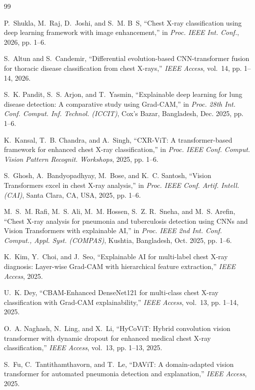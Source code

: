 \documentclass[journal]{IEEEtran}
\begin{document}
\begin{thebibliography}{99}

P.~Shukla, M.~Raj, D.~Joshi, and S.~M. B~S, ``Chest X-ray classification using deep learning framework with image enhancement,'' in \emph{Proc. IEEE Int. Conf.}, 2026, pp. 1--6.

S.~Altun and S.~Candemir, ``Differential evolution-based CNN-transformer fusion for thoracic disease classification from chest X-rays,'' \emph{IEEE Access}, vol.~14, pp. 1--14, 2026.

S.~K. Pandit, S.~S. Arjon, and T.~Yasmin, ``Explainable deep learning for lung disease detection: A comparative study using Grad-CAM,'' in \emph{Proc. 28th Int. Conf. Comput. Inf. Technol. (ICCIT)}, Cox's Bazar, Bangladesh, Dec. 2025, pp. 1--6.

K.~Kansal, T.~B. Chandra, and A.~Singh, ``CXR-ViT: A transformer-based framework for enhanced chest X-ray classification,'' in \emph{Proc. IEEE Conf. Comput. Vision Pattern Recognit. Workshops}, 2025, pp. 1--6.

S.~Ghosh, A.~Bandyopadhyay, M.~Bose, and K.~C. Santosh, ``Vision Transformers excel in chest X-ray analysis,'' in \emph{Proc. IEEE Conf. Artif. Intell. (CAI)}, Santa Clara, CA, USA, 2025, pp. 1--6.

M.~S.~M. Rafi, M.~S. Ali, M.~M. Hossen, S.~Z. R.~Sneha, and M.~S. Arefin, ``Chest X-ray analysis for pneumonia and tuberculosis detection using CNNs and Vision Transformers with explainable AI,'' in \emph{Proc. IEEE 2nd Int. Conf. Comput., Appl. Syst. (COMPAS)}, Kushtia, Bangladesh, Oct. 2025, pp. 1--6.

K.~Kim, Y.~Choi, and J.~Seo, ``Explainable AI for multi-label chest X-ray diagnosis: Layer-wise Grad-CAM with hierarchical feature extraction,'' \emph{IEEE Access}, 2025.

U.~K. Dey, ``CBAM-Enhanced DenseNet121 for multi-class chest X-ray classification with Grad-CAM explainability,'' \emph{IEEE Access}, vol.~13, pp. 1--14, 2025.

O.~A. Naghash, N.~Ling, and X.~Li, ``HyCoViT: Hybrid convolution vision transformer with dynamic dropout for enhanced medical chest X-ray classification,'' \emph{IEEE Access}, vol.~13, pp. 1--13, 2025.

S.~Fu, C.~Tantithamthavorn, and T.~Le, ``DAViT: A domain-adapted vision transformer for automated pneumonia detection and explanation,'' \emph{IEEE Access}, 2025.


\end{thebibliography}
\end{document}
